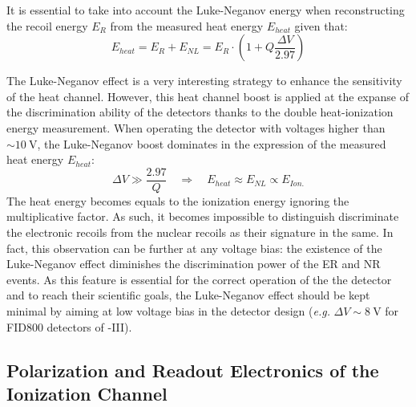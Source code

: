 It is essential to take into account the Luke-Neganov energy when reconstructing the recoil energy $E_R$ from the measured heat energy $E_{heat}$ given that:
\begin{equation}
\label{eq:heat-energy-nl-boost}
E_{heat} = E_R + E_{NL} = E_R \cdot \left( 1 + Q \frac{\Delta V}{2.97} \right)
\end{equation}

The Luke-Neganov effect is a very interesting strategy to enhance the sensitivity of the heat channel. However, this heat channel boost is applied at the expanse of the discrimination ability of the detectors thanks to the double heat-ionization energy measurement. When operating the detector with voltages higher than $\sim \SI{10}{\volt}$, the Luke-Neganov boost dominates in the expression of the measured heat energy $E_{heat}$:
\begin{equation}
\Delta V \gg \frac{2.97}{Q}
\quad \Rightarrow \quad
E_{heat} \approx E_{NL} \propto E_{Ion.}
\end{equation}
The heat energy becomes equals to the ionization energy ignoring the multiplicative factor. As such, it becomes impossible to distinguish discriminate the electronic recoils from the nuclear recoils as their signature in the same. In fact, this observation can be further at any voltage bias: the existence of the Luke-Neganov effect diminishes the discrimination power of the ER and NR events. As this feature is essential for the correct operation of the the detector and to reach their scientific goals, the Luke-Neganov effect should be kept minimal by aiming at low voltage bias in the detector design  ({\it e.g.} $\Delta V \sim \SI{8}{\volt}$ for FID800 detectors of \Edelweiss{}-III).



\subsection{Polarization and Readout Electronics of the Ionization Channel}
\label{par:electronics-ionization}
\label{par:ionization-electronics}
\label{par:adu-unit}
\label{par:reset-procedure}
\label{par:maintenance-procedure}

